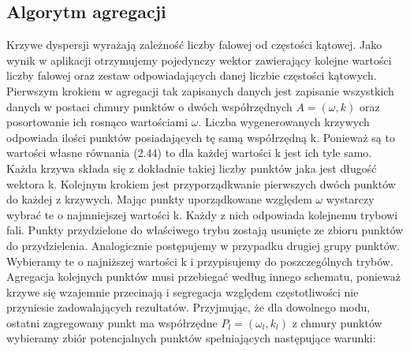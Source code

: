\subsection{Algorytm agregacji}
 Krzywe dyspersji wyrażają zależność liczby falowej od częstości kątowej. Jako wynik w aplikacji otrzymujemy pojedynczy wektor zawierający kolejne wartości liczby falowej oraz zestaw odpowiadających danej liczbie częstości kątowych. Pierwszym krokiem w agregacji tak zapisanych danych jest zapisanie wszystkich danych w postaci chmury punktów o dwóch współrzędnych $A=(\omega , k)$ oraz posortowanie ich rosnąco wartościami $\omega$. Liczba wygenerowanych krzywych odpowiada ilości punktów posiadających tę samą współrzędną k. Ponieważ są to wartości własne równania (2.44) to dla każdej wartości k jest ich tyle samo. Każda krzywa składa się z dokładnie takiej liczby punktów jaka jest długość wektora k. Kolejnym krokiem jest przyporządkwanie pierwszych dwóch punktów do każdej z krzywych. Mając punkty uporządkowane względem $\omega$ wystarczy wybrać te o najmniejszej wartości k. Każdy z nich odpowiada kolejnemu trybowi fali. Punkty przydzielone do właściwego trybu zostają usunięte ze zbioru punktów do przydzielenia. Analogicznie postępujemy w przypadku drugiej grupy punktów. Wybieramy te o najniższej wartości k i przypisujemy do poszczególnych trybów. Agregacja kolejnych punktów musi przebiegać według innego schematu, ponieważ krzywe się wzajemnie przecinają i segregacja względem częstotliwości nie przyniesie zadowalających rezultatów. Przyjmując, że dla dowolnego modu, ostatni zagregowany punkt ma współrzędne $P_l = (\omega _l,k_l)$ z chmury punktów wybieramy zbiór potencjalnych punktów spełniających następujące warunki:
